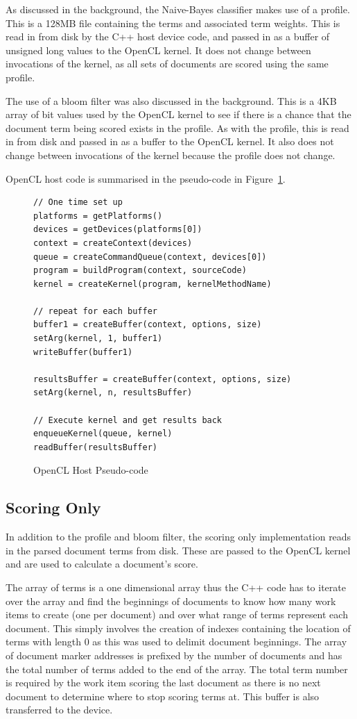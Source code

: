 As discussed in the background, the Naive-Bayes classifier makes use of a
profile. This is a 128MB file containing the terms and associated term weights.
This is read in from disk by the C++ host device code, and passed in as a buffer
of unsigned long values to the OpenCL kernel. It does not change between
invocations of the kernel, as all sets of documents are scored using the same
profile.

The use of a bloom filter was also discussed in the background. This is a 4KB
array of bit values used by the OpenCL kernel to see if there is a chance that
the document term being scored exists in the profile. As with the profile, this
is read in from disk and passed in as a buffer to the OpenCL kernel. It also
does not change between invocations of the kernel because the profile does not
change.

OpenCL host code is summarised in the pseudo-code in
Figure~\ref{fig:openCLPseudocode}.

\begin{figure}
\begin{verbatim}
// One time set up
platforms = getPlatforms()
devices = getDevices(platforms[0])
context = createContext(devices)
queue = createCommandQueue(context, devices[0])
program = buildProgram(context, sourceCode)
kernel = createKernel(program, kernelMethodName)

// repeat for each buffer
buffer1 = createBuffer(context, options, size)
setArg(kernel, 1, buffer1)
writeBuffer(buffer1)

resultsBuffer = createBuffer(context, options, size)
setArg(kernel, n, resultsBuffer)

// Execute kernel and get results back
enqueueKernel(queue, kernel)
readBuffer(resultsBuffer)
\end{verbatim}
\caption{OpenCL Host Pseudo-code}
\label{fig:openCLPseudocode}
\end{figure}

\subsection{Scoring Only}

In addition to the profile and bloom filter, the scoring only implementation
reads in the parsed document terms from disk. These are passed to the OpenCL
kernel and are used to calculate a document's score.

The array of terms is a one dimensional array thus the C++ code has to iterate
over the array and find the beginnings of documents to know how many work items
to create (one per document) and over what range of terms represent each
document. This simply involves the creation of indexes containing the location
of terms with length 0 as this was used to delimit document beginnings. The
array of document marker addresses is prefixed by the number of documents and
has the total number of terms added to the end of the array. The total term
number is required by the work item scoring the last document as there is no
next document to determine where to stop scoring terms at. This buffer is also
transferred to the device.

